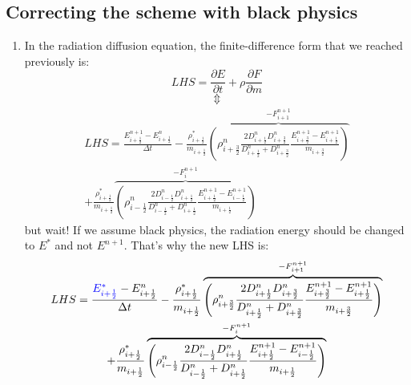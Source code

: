 \documentclass[11pt]{article}
\begin{document}
\subsection{Correcting the scheme with black physics}
\begin{enumerate}
  \item In the radiation diffusion equation, the finite-difference form that we reached previously is:
  \begin{equation}
      LHS = \frac{\partial{E}}{\partial t}+\rho \frac{\partial F}{\partial m} 
    \end{equation}  
  \begin{equation} \Updownarrow \end{equation}
  \begin{equation}
    \begin{gathered}
  LHS = \frac{E_{i+\frac{1}{2}}^{n+1} - E_{i+\frac{1}{2}}^n}{\Delta t} - \frac{\rho_{i+\frac{1}{2}}^{*}}{m_{i+\frac{1}{2}}} \overbrace{\left(\rho_{i+\frac{3}{2}}^n \frac{2D_{i+\frac{1}{2}}^{n} D_{i+\frac{3}{2}}^{n}}{D_{i+\frac{1}{2}}^{n} + D_{i+\frac{3}{2}}^{n}}\frac{E_{i+\frac{3}{2}}^{n+1} - E_{i+\frac{1}{2}}^{n+1}}{m_{i+\frac{3}{2}}}\right)}^{-F_{i+1}^{n+1}} \\ + \frac{\rho_{i+\frac{1}{2}}^{*}}{m_{i+\frac{1}{2}}}\overbrace{\left(\rho_{i-\frac{1}{2}}^n \frac{2D_{i-\frac{1}{2}}^{n} D_{i+\frac{1}{2}}^{n}}{D_{i-\frac{1}{2}}^{n} + D_{i+\frac{1}{2}}^{n}}\frac{E_{i+\frac{1}{2}}^{n+1} - E_{i-\frac{1}{2}}^{n+1}}{m_{i+\frac{1}{2}}}\right)}^{-F_{i}^{n+1}}
  \end{gathered}
  \end{equation}
  but wait! If we assume black physics, the radiation energy should be changed to $E^*$ and not $E^{n+1}$. That's why the new LHS is:
  \begin{equation}
    \begin{gathered}
  LHS = \frac{\textcolor{blue}{E_{i+\frac{1}{2}}^{*}} - E_{i+\frac{1}{2}}^n}{\Delta t} - \frac{\rho_{i+\frac{1}{2}}^{*}}{m_{i+\frac{1}{2}}} \overbrace{\left(\rho_{i+\frac{3}{2}}^n \frac{2D_{i+\frac{1}{2}}^{n} D_{i+\frac{3}{2}}^{n}}{D_{i+\frac{1}{2}}^{n} + D_{i+\frac{3}{2}}^{n}}\frac{E_{i+\frac{3}{2}}^{n+1} - E_{i+\frac{1}{2}}^{n+1}}{m_{i+\frac{3}{2}}}\right)}^{-F_{i+1}^{n+1}} \\ + \frac{\rho_{i+\frac{1}{2}}^{*}}{m_{i+\frac{1}{2}}}\overbrace{\left(\rho_{i-\frac{1}{2}}^n \frac{2D_{i-\frac{1}{2}}^{n} D_{i+\frac{1}{2}}^{n}}{D_{i-\frac{1}{2}}^{n} + D_{i+\frac{1}{2}}^{n}}\frac{E_{i+\frac{1}{2}}^{n+1} - E_{i-\frac{1}{2}}^{n+1}}{m_{i+\frac{1}{2}}}\right)}^{-F_{i}^{n+1}}
  \end{gathered}
  \end{equation}
  

\end{enumerate}
\end{document}
